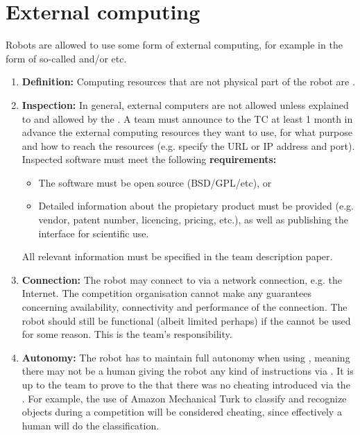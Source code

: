 \section{External computing}\label{rule:robot_external_computing}
Robots are allowed to use some form of external computing, for example in the form of so-called  and/or  etc.
\begin{enumerate}
	\item \textbf{Definition:} Computing resources that are not physical part of the robot are .
	\item \textbf{Inspection:} In general, external computers are not allowed unless explained to and allowed by the .
	  A team must announce to the TC at least 1 month in advance the external computing resources they want to use, for what purpose and how to reach the resources (e.g. specify the URL or IP address and port). Inspected software must meet the following \textbf{requirements:}
	  \begin{itemize}
	  	\item The software must be open source (BSD/GPL/etc), or
        \item Detailed information about the propietary product must be provided (e.g. vendor, patent number, licencing, pricing, etc.), as well as publishing the interface for scientific use.
	  \end{itemize}
	All relevant information must be specified in the team description paper.
	\item \textbf{Connection:} The robot may connect to  via a network connection, e.g. the Internet.
	  The competition organisation cannot make any guarantees concerning availability, connectivity and performance of the connection.
	  The robot should still be functional (albeit limited perhaps) if the  cannot be used for some reason.
	  This is the team's responsibility.
	\item \textbf{Autonomy:} The robot has to maintain full autonomy when using ,
	  meaning there may not be a human giving the robot any kind of instructions via .
	  It is up to the team to prove to the  that there was no cheating introduced via the .
	  For example, the use of Amazon Mechanical Turk to classify and recognize objects during a competition will be considered cheating, since effectively a human will do the classification.

\end{enumerate}
